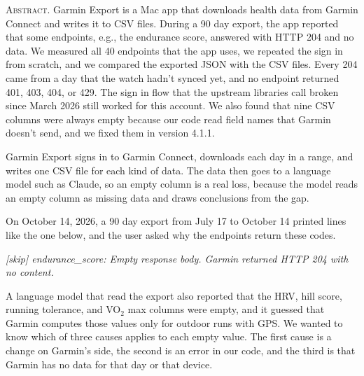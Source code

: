 \documentclass[11pt]{article}
\newcommand\code[1]{\textit{#1}}
\begin{document}

\begin{center}\footnotesize\begin{minipage}{290pt}
\textsc{Abstract.} Garmin Export is a Mac app that downloads health data from Garmin Connect and writes it to CSV files. During a 90 day export, the app reported that some endpoints, e.g., the endurance score, answered with HTTP 204 and no data. We measured all 40 endpoints that the app uses, we repeated the sign in from scratch, and we compared the exported JSON with the CSV files. Every 204 came from a day that the watch hadn't synced yet, and no endpoint returned 401, 403, 404, or 429. The sign in flow that the upstream libraries call broken since March 2026 still worked for this account. We also found that nine CSV columns were always empty because our code read field names that Garmin doesn't send, and we fixed them in version 4.1.1.
\end{minipage}\end{center}
\medskip

 Garmin Export signs in to Garmin Connect, downloads each day in a range, and writes one CSV file for each kind of data. The data then goes to a language model such as Claude, so an empty column is a real loss, because the model reads an empty column as missing data and draws conclusions from the gap.

On October 14, 2026, a 90 day export from July 17 to October 14 printed lines like the one below, and the user asked why the endpoints return these codes.

\smallskip
{\footnotesize\noindent\code{[skip] endurance\_score: Empty response body. Garmin returned HTTP 204 with no content.}}
\smallskip

\noindent A language model that read the export also reported that the HRV, hill score, running tolerance, and VO$_2$ max columns were empty, and it guessed that Garmin computes those values only for outdoor runs with GPS. We wanted to know which of three causes applies to each empty value. The first cause is a change on Garmin's side, the second is an error in our code, and the third is that Garmin has no data for that day or that device.
\end{document}
